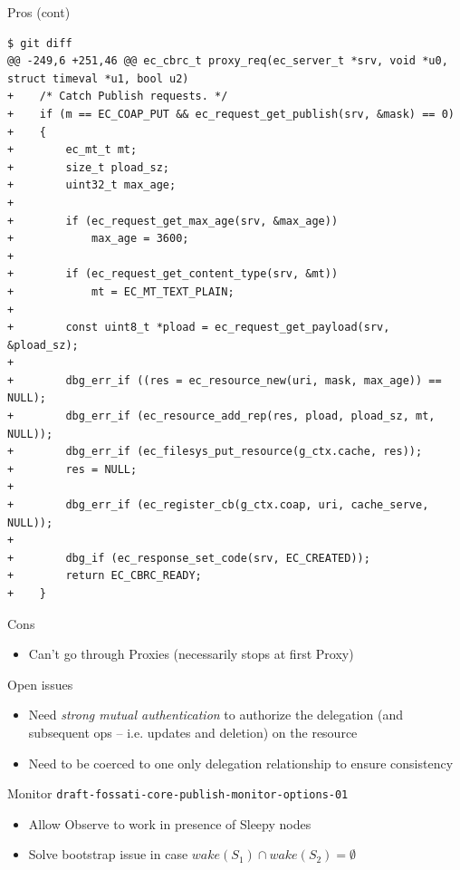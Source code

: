 \documentclass{beamer}
\begin{document}
\begin{frame}[fragile]{Pros (cont)}


{\tiny 
\begin{verbatim}
$ git diff
@@ -249,6 +251,46 @@ ec_cbrc_t proxy_req(ec_server_t *srv, void *u0, struct timeval *u1, bool u2)
+    /* Catch Publish requests. */
+    if (m == EC_COAP_PUT && ec_request_get_publish(srv, &mask) == 0)
+    {
+        ec_mt_t mt;
+        size_t pload_sz;
+        uint32_t max_age;
+
+        if (ec_request_get_max_age(srv, &max_age))
+            max_age = 3600;
+
+        if (ec_request_get_content_type(srv, &mt))
+            mt = EC_MT_TEXT_PLAIN;
+
+        const uint8_t *pload = ec_request_get_payload(srv, &pload_sz);
+
+        dbg_err_if ((res = ec_resource_new(uri, mask, max_age)) == NULL);
+        dbg_err_if (ec_resource_add_rep(res, pload, pload_sz, mt, NULL));
+        dbg_err_if (ec_filesys_put_resource(g_ctx.cache, res));
+        res = NULL;
+
+        dbg_err_if (ec_register_cb(g_ctx.coap, uri, cache_serve, NULL));
+
+        dbg_if (ec_response_set_code(srv, EC_CREATED));
+        return EC_CBRC_READY;        
+    }
\end{verbatim}
}
\end{frame}

\begin{frame}{Cons}
\begin{itemize}
 \item Can't go through Proxies (necessarily stops at first Proxy)
\end{itemize}
\end{frame}

\begin{frame}{Open issues}

\begin{itemize}
 \item Need \emph{strong mutual authentication} to authorize the delegation (and subsequent ops -- i.e. updates and deletion) on the resource
 \item Need to be coerced to one only delegation relationship to ensure consistency
\end{itemize}

\end{frame}

\begin{frame}{Monitor \hspace{5cm} {\tiny \texttt{draft-fossati-core-publish-monitor-options-01}}}

\begin{itemize}
 \item Allow Observe to work in presence of Sleepy nodes %
 \item Solve bootstrap issue in case {\scriptsize $wake(S_1) \cap wake(S_2) = \emptyset$}
\end{itemize}

\end{frame}
\end{document}
